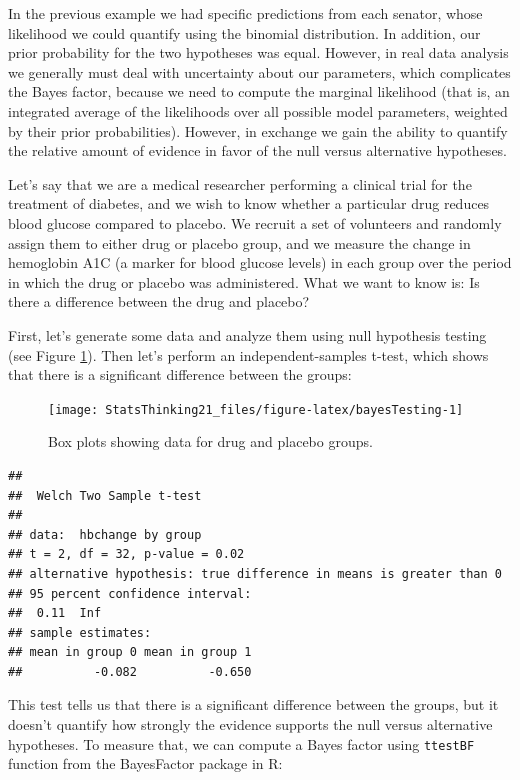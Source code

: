 \documentclass[12pt,]{book}
\theoremstyle{definition}
\theoremstyle{definition}
\theoremstyle{definition}
\theoremstyle{remark}
\begin{document}
In the previous example we had specific predictions from each senator, whose likelihood we could quantify using the binomial distribution. In addition, our prior probability for the two hypotheses was equal. However, in real data analysis we generally must deal with uncertainty about our parameters, which complicates the Bayes factor, because we need to compute the marginal likelihood (that is, an integrated average of the likelihoods over all possible model parameters, weighted by their prior probabilities). However, in exchange we gain the ability to quantify the relative amount of evidence in favor of the null versus alternative hypotheses.

Let's say that we are a medical researcher performing a clinical trial for the treatment of diabetes, and we wish to know whether a particular drug reduces blood glucose compared to placebo. We recruit a set of volunteers and randomly assign them to either drug or placebo group, and we measure the change in hemoglobin A1C (a marker for blood glucose levels) in each group over the period in which the drug or placebo was administered. What we want to know is: Is there a difference between the drug and placebo?

First, let's generate some data and analyze them using null hypothesis testing (see Figure \ref{fig:bayesTesting}). Then let's perform an independent-samples t-test, which shows that there is a significant difference between the groups:

\begin{figure}
\texttt{[image: StatsThinking21\_files/figure-latex/bayesTesting-1]} \caption{Box plots showing data for drug and placebo groups.}\label{fig:bayesTesting}
\end{figure}

\begin{verbatim}
## 
##  Welch Two Sample t-test
## 
## data:  hbchange by group
## t = 2, df = 32, p-value = 0.02
## alternative hypothesis: true difference in means is greater than 0
## 95 percent confidence interval:
##  0.11  Inf
## sample estimates:
## mean in group 0 mean in group 1 
##          -0.082          -0.650
\end{verbatim}

This test tells us that there is a significant difference between the groups, but it doesn't quantify how strongly the evidence supports the null versus alternative hypotheses. To measure that, we can compute a Bayes factor using \texttt{ttestBF} function from the BayesFactor package in R:
\end{document}
